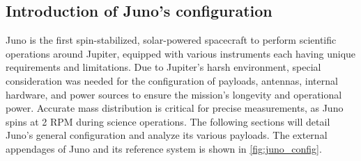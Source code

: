 \subsection{Introduction of Juno's configuration}
\label{subsec:config_introduction}

Juno is the first spin-stabilized, solar-powered spacecraft to perform scientific operations around Jupiter, equipped with various instruments each having unique requirements and limitations. Due to Jupiter's harsh environment, special consideration was needed for the configuration of payloads, antennas, internal hardware, and power sources to ensure the mission's longevity and operational power. Accurate mass distribution is critical for precise measurements, as Juno spins at 2 RPM during science operations.\cite{Juno_launch} The following sections will detail Juno's general configuration and analyze its various payloads.
The external appendages of Juno and its reference system is shown in \autoref{fig:juno_config}.